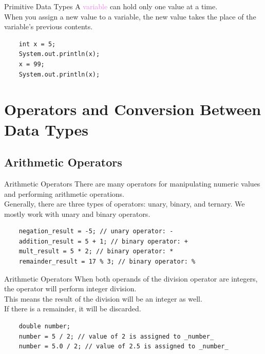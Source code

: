 \documentclass[11pt]{beamer}
\newcommand{\violet}[1]{\textcolor{violet}{#1}}
\begin{document}
\begin{frame}[fragile]{Primitive Data Types}
    A \violet{variable} can hold only one value at a time. \\ \vspace{1em}
    When you assign a new value to a variable, the new value takes the place of the variable's previous contents.
    \begin{lstlisting}
    int x = 5;
    System.out.println(x);
    x = 99;
    System.out.println(x);
    \end{lstlisting}
\end{frame}

\section{Operators and Conversion Between Data Types}
\subsection{Arithmetic Operators}
\begin{frame}[fragile]{Arithmetic Operators}
    There are many operators for manipulating numeric values and performing arithmetic operations. \\ \vspace{1em}
    Generally, there are three types of operators: unary, binary, and ternary. We mostly work with unary and binary operators.
    \begin{lstlisting}
    negation_result = -5; // unary operator: -
    addition_result = 5 + 1; // binary operator: +
    mult_result = 5 * 2; // binary operator: *
    remainder_result = 17 % 3; // binary operator: %
    \end{lstlisting}
\end{frame}

\begin{frame}[fragile]{Arithmetic Operators}
    When both operands of the division operator are integers, the operator will perform integer division. \\ \vspace{1em}
    This means the result of the division will be an integer as well. \\ \vspace{1em}
    If there is a remainder, it will be discarded.
    \begin{lstlisting}
    double number;
    number = 5 / 2; // value of 2 is assigned to _number_
    number = 5.0 / 2; // value of 2.5 is assigned to _number_
    \end{lstlisting}
\end{frame}
\end{document}
